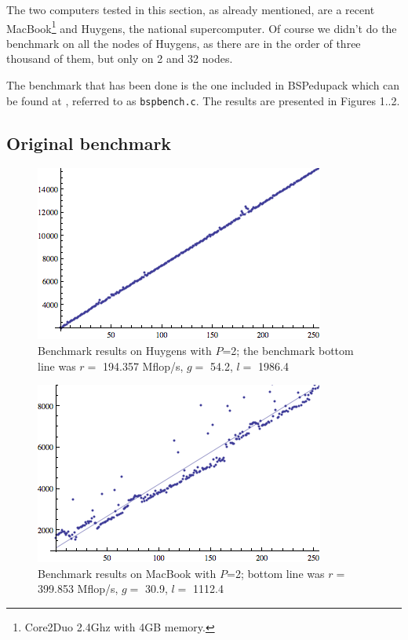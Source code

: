 \documentclass[a4paper]{article}
\begin{document}
The two computers tested in this section, as already mentioned, are a recent
MacBook\footnote{Core2Duo 2.4Ghz with 4GB memory.} and Huygens, the national
supercomputer. Of course we didn't do the benchmark on all the nodes of Huygens,
as there are in the order of three thousand of them, but only on 2 and 32 nodes. 

The benchmark that has been done is the one included in BSPedupack which can be
found at \cite{edupack}, referred to as \texttt{bspbench.c}. The results are
presented in Figures 1..2. 
\subsection{Original benchmark}
\begin{figure}[h]
    \begin{center}
        \includegraphics{img/bench-huy-put-p2.png}
    \end{center}
    \caption{Benchmark results on Huygens with $P$=2; the benchmark bottom line
    was $r=$ 194.357 Mflop/s, $g=$ 54.2, $l=$ 1986.4}
    \label{fig:bench-huy-put-p2}
\end{figure}

\begin{figure}[h]
    \begin{center}
        \includegraphics{img/bench-laptop-put.png}
    \end{center}
    \caption{Benchmark results on MacBook with $P$=2; bottom line was  $r=$
    399.853 Mflop/s, $g=$ 30.9, $l=$ 1112.4 }
    \label{fig:bench-laptop-put-p2}
\end{figure}
\end{document}
